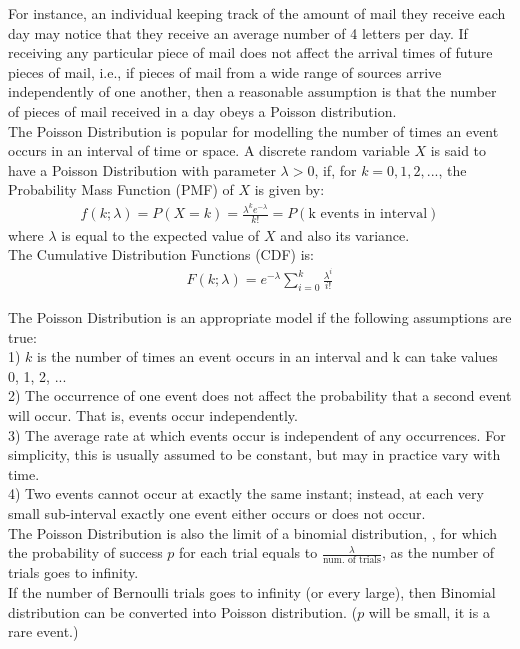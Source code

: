 For instance, an individual keeping track of the amount of mail they receive each day may notice that they receive an average number of 4 letters per day. If receiving any particular piece of mail does not affect the arrival times of future pieces of mail, i.e., if pieces of mail from a wide range of sources arrive independently of one another, then a reasonable assumption is that the number of pieces of mail received in a day obeys a Poisson distribution. \\

The Poisson Distribution is popular for modelling the number of times an event occurs in an interval of time or space. A discrete random variable $X$ is said to have a Poisson Distribution with parameter $\lambda > 0$, if, for $k = 0,1,2, ...$, the Probability Mass Function (PMF) of $X$ is given by:
\begin{eqnarray}
f(k;\lambda) = P(X=k) = \frac{\lambda^k e^{- \lambda}}{k !} = P(\text{k events in interval})
\label{poisson_pmf}
\end{eqnarray}
where $\lambda$ is equal to the expected value of $X$ and also its variance.\\

The Cumulative Distribution Functions (CDF) is:
\begin{eqnarray}
F(k;\lambda) = e^{- \lambda} \sum^{k}_{i=0} \frac{\lambda^i}{i !}
\label{poisson_cdf}
\end{eqnarray}

The Poisson Distribution is an appropriate model if the following assumptions are true: \\
1) $k$ is the number of times an event occurs in an interval and k can take values 0, 1, 2, ...\\
2) The occurrence of one event does not affect the probability that a second event will occur. That is, events occur independently.\\
3) The average rate at which events occur is independent of any occurrences. For simplicity, this is usually assumed to be constant, but may in practice vary with time.\\
4) Two events cannot occur at exactly the same instant; instead, at each very small sub-interval exactly one event either occurs or does not occur.\\

The Poisson Distribution is also the limit of a binomial distribution, , for which the probability of success $p$ for each trial equals to $\frac{\lambda}{\text{num. of trials}}$, as the number of trials goes to infinity. \\
If the number of Bernoulli trials goes to infinity (or every large), then Binomial distribution can be converted into Poisson distribution. ($p$ will be small, it is a rare event.)

